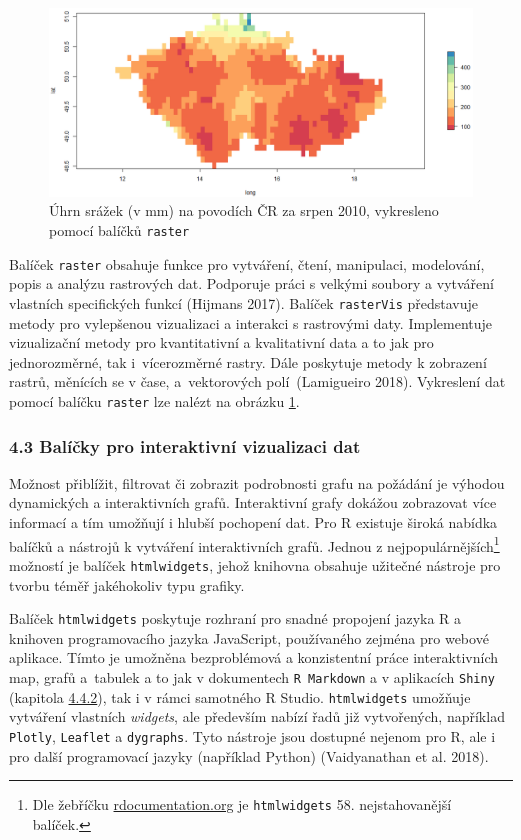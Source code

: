 \documentclass[12pt,]{article}
\let\rmarkdownfootnote\footnote%
\def\footnote{\protect\rmarkdownfootnote}
\begin{document}
\begin{figure}[H]
  \centering
      \includegraphics[width=\textwidth]{fig/raster_map2}
      \caption{Úhrn srážek (v mm) na povodích ČR za srpen 2010, vykresleno pomocí balíčků \texttt{raster}} 
      \label{fig:ch4.3}
\end{figure}

\qquad Balíček \texttt{raster} obsahuje funkce pro vytváření, čtení,
manipulaci, modelování, popis a analýzu rastrových dat. Podporuje práci
s velkými soubory a vytváření vlastních specifických funkcí (Hijmans
2017). Balíček \texttt{rasterVis} představuje metody pro vylepšenou
vizualizaci a interakci s rastrovými daty. Implementuje vizualizační
metody pro kvantitativní a kvalitativní data a to jak pro jednorozměrné,
tak i~vícerozměrné rastry. Dále poskytuje metody k zobrazení rastrů,
měnících se v čase, a~vektorových polí~(Lamigueiro 2018). Vykreslení dat
pomocí balíčku \texttt{raster} lze nalézt na obrázku \ref{fig:ch4.3}.

\hypertarget{htmlwidgets}{\subsubsection{4.3 Balíčky pro interaktivní
vizualizaci dat}\label{htmlwidgets}}

\qquad Možnost přiblížit, filtrovat či zobrazit podrobnosti grafu na
požádání je výhodou dynamických a interaktivních grafů. Interaktivní
grafy dokážou zobrazovat více informací a tím umožňují i hlubší
pochopení dat. Pro R existuje široká nabídka balíčků a nástrojů k
vytváření interaktivních grafů. Jednou z nejpopulárnějších\footnote{Dle
  žebříčku \href{https://www.rdocumentation.org/}{rdocumentation.org} je
  \texttt{htmlwidgets} 58. nejstahovanější balíček.} možností je balíček
\texttt{htmlwidgets}, jehož knihovna obsahuje užitečné nástroje pro
tvorbu téměř jakéhokoliv typu grafiky.

\qquad Balíček \texttt{htmlwidgets} poskytuje rozhraní pro snadné
propojení jazyka R a knihoven programovacího jazyka JavaScript,
používaného zejména pro webové aplikace. Tímto je umožněna bezproblémová
a konzistentní práce interaktivních map, grafů a~tabulek a to jak v
dokumentech \texttt{R\ Markdown} a v aplikacích \texttt{Shiny} (kapitola
\protect\hyperlink{shiny}{4.4.2}), tak i v rámci samotného R Studio.
\texttt{htmlwidgets} umožňuje vytváření vlastních \emph{widgets}, ale
především nabízí řadů již vytvořených, například \texttt{Plotly},
\texttt{Leaflet} a \texttt{dygraphs}. Tyto nástroje jsou dostupné
nejenom pro R, ale i pro další programovací jazyky (například Python)
(Vaidyanathan et al. 2018).
\end{document}
